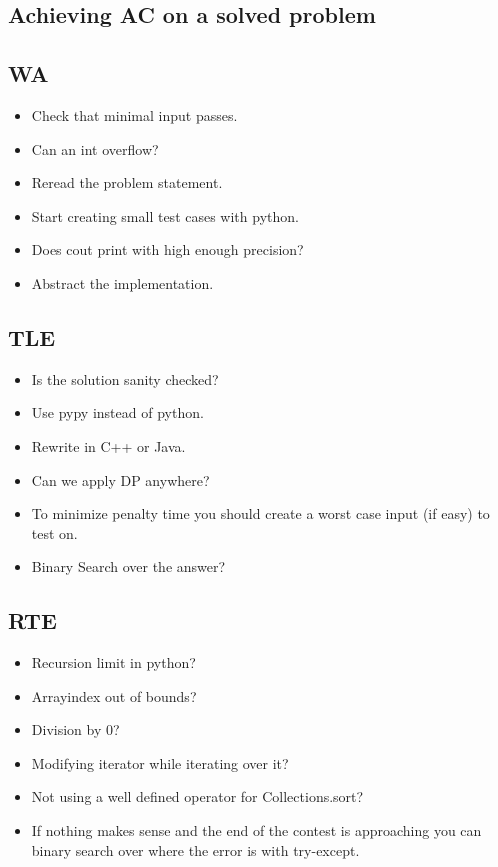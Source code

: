 \documentclass[8pt,a4paper,landscape,oneside]{amsart}
\begin{document}
\begin{multicols*}{2}
\begin{large}
\section{Achieving AC on a solved problem}
    \subsection{WA}
        \begin{itemize}
        \item Check that minimal input passes.
        \item Can an int overflow?
        \item Reread the problem statement.
        \item Start creating small test cases with python.
        \item Does cout print with high enough precision?
        \item Abstract the implementation.
        \end{itemize}
    \subsection{TLE}
        \begin{itemize}
        \item Is the solution sanity checked?
        \item Use pypy instead of python.
        \item Rewrite in C++ or Java.
        \item Can we apply DP anywhere?
        \item To minimize penalty time you should create a worst case input (if easy) to test on.
        \item Binary Search over the answer?
        \end{itemize}
    \subsection{RTE}
        \begin{itemize}
        \item Recursion limit in python?
        \item Arrayindex out of bounds?
        \item Division by $0$?
        \item Modifying iterator while iterating over it?
        \item Not using a well defined operator for Collections.sort?
        \item If nothing makes sense and the end of the contest is approaching you 
            can binary search over where the error is with try-except.
        \end{itemize}

\end{large}
\end{multicols*}
\end{document}
